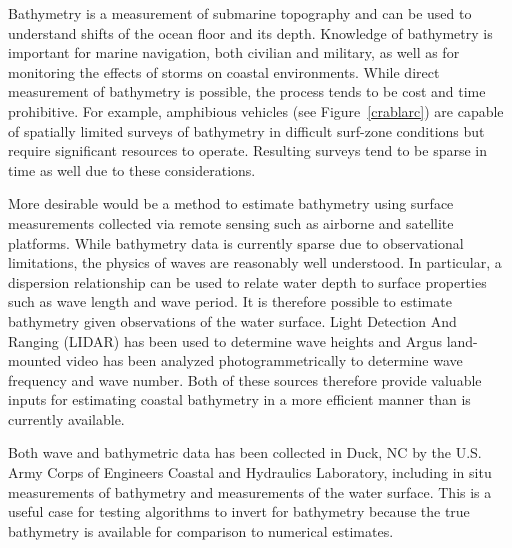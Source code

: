 Bathymetry is a measurement of submarine topography and can be used to understand shifts of the ocean floor and its depth. Knowledge of bathymetry is important for marine navigation, both civilian and military, as well as for monitoring the effects of storms on coastal environments. While direct measurement of bathymetry is possible, the process tends to be cost and time prohibitive. For example, amphibious vehicles (see Figure~\ref{crablarc}) are capable of spatially limited surveys of bathymetry in difficult surf-zone conditions but require significant resources to operate. Resulting surveys tend to be sparse in time as well due to these considerations. 

More desirable would be a method to estimate bathymetry using surface measurements collected via remote sensing such as airborne and satellite platforms. While bathymetry data is currently sparse due to observational limitations, the physics of waves are reasonably well understood. In particular, a dispersion relationship can be used to relate water depth to surface properties such as wave length and wave period. It is therefore possible to estimate bathymetry given observations of the water surface. Light Detection And Ranging (LIDAR) has been used to determine wave heights and Argus land-mounted video has been analyzed photogrammetrically to determine wave frequency and wave number. Both of these sources therefore provide valuable inputs for estimating coastal bathymetry in a more efficient manner than is currently available.


Both wave and bathymetric data has been collected in Duck, NC by the U.S. Army Corps of Engineers Coastal and Hydraulics Laboratory, including in situ measurements of bathymetry and measurements of the water surface. This is a useful case for testing algorithms to invert for bathymetry because the true bathymetry is available for comparison to numerical estimates.
